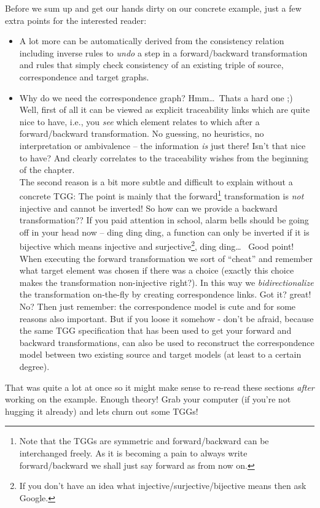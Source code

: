 Before we sum up and get our hands dirty on our concrete example, just a few extra points for the interested reader:  
\begin{itemize}
\item A lot more can be automatically derived from the consistency relation including inverse rules to \emph{undo} a step in a forward/backward transformation and rules that simply check consistency of an existing triple of source, correspondence and target graphs.

\item Why do we need the correspondence graph?  Hmm\dots\, Thats a hard one ;)  Well, first of all it can be viewed as explicit traceability links which are quite nice to have, i.e., you \emph{see} which element relates to which after a forward/backward transformation. No guessing, no heuristics, no interpretation or ambivalence -- the information \emph{is} just there!
Isn't that nice to have? And clearly correlates to the traceability wishes from the beginning of the chapter.\\
The second reason is a bit more subtle and difficult to explain without a concrete TGG:  The point is mainly that the forward\footnote{Note that the TGGs are symmetric and forward/backward can be interchanged freely.  As it is becoming a pain to always write forward/backward we shall just say forward as from now on.} transformation is \emph{not} injective and cannot be inverted!
So how can we provide a backward transformation??
If you paid attention in school, alarm bells should be going off in your head now -- ding ding ding, a function can only be inverted if it is bijective which means injective and surjective\footnote{If you don't have an idea what injective/surjective/bijective means then ask Google.}, ding ding\ldots~
Good point!  When executing the forward transformation we sort of ``cheat'' and remember what target element was chosen if there was a choice (exactly this choice makes the transformation non-injective right?).
In this way we \emph{bidirectionalize} the transformation on-the-fly by creating correspondence links.
Got it? great! No?  Then just remember: the correspondence model is cute and for some reasons also important.
But if you loose it somehow - don't be afraid, because the same TGG specification that has been used to get your forward and backward transformations, can also be used to reconstruct the correspondence model between two existing source and target models (at least to a certain degree).
\end{itemize}

That was quite a lot at once so it might make sense to re-read these sections \emph{after} working on the example.
Enough theory!  Grab your computer (if you're not hugging it already) and lets churn out some TGGs!
